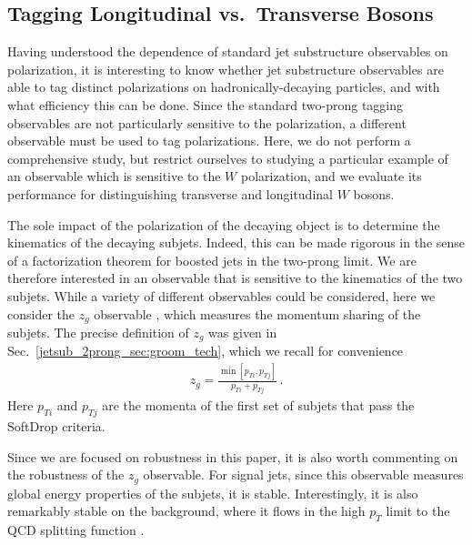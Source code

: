 \documentclass[11pt,letterpaper]{article}
\begin{document}
\subsection{Tagging Longitudinal vs.\ Transverse Bosons}\label{jetsub_2prong_sec:polar_tag}

Having understood the dependence of standard jet substructure observables on polarization, it is interesting to know whether jet substructure observables are able to tag distinct polarizations on hadronically-decaying particles, and with what efficiency this can be done.
%
Since the standard two-prong tagging observables are not particularly sensitive to the polarization, a different observable must be used to tag polarizations.
%
Here, we do not perform a comprehensive study, but restrict ourselves to studying a particular example of an observable which is sensitive to the $W$ polarization, and we evaluate its performance for distinguishing transverse and longitudinal $W$ bosons. 

The sole impact of the polarization of the decaying object is to determine the kinematics of the decaying subjets.
%
Indeed, this can be made rigorous in the sense of a factorization theorem for boosted jets in the two-prong limit.
%
We are therefore interested in an observable that is sensitive to the kinematics of the two subjets.
%
While a variety of different observables could be considered, here we consider the $z_g$ observable \cite{Larkoski:2014wba,Larkoski:2014bia,Larkoski:2015lea}, which measures the momentum sharing of the subjets. The precise definition of $z_g$ was given in Sec.~\ref{jetsub_2prong_sec:groom_tech}, which we recall for convenience
\begin{align}
z_g=\frac{\min\left[ p_{Ti}, p_{Tj}  \right]}{p_{Ti}+p_{Tj}}\,.
\end{align}
Here $p_{Ti}$ and $p_{Tj}$ are the momenta of the first set of subjets that pass the SoftDrop criteria.


Since we are focused on robustness in this paper, it is also worth commenting on the robustness of the $z_g$ observable. For signal jets, since this observable measures global energy properties of the subjets, it is stable.
%
Interestingly, it is also remarkably stable on the background, where it flows in the high $p_T$ limit to the QCD splitting function \cite{Larkoski:2014wba,Larkoski:2014bia,Larkoski:2015lea}.
\end{document}
